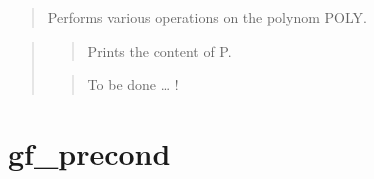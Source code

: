 \documentclass[a4paper,11pt,english]{sphinxmanual}
\begin{document}
\begin{sphinxVerbatim}[commandchars=\\\{\}]
  
  
\end{sphinxVerbatim}

\sphinxAtStartPar
{}
\begin{quote}

\sphinxAtStartPar
Performs various operations on the polynom POLY.
\end{quote}

\sphinxAtStartPar
{}
\begin{quote}

\sphinxAtStartPar
{}
\begin{quote}

\sphinxAtStartPar
Prints the content of P.
\end{quote}

\sphinxAtStartPar
{}
\begin{quote}

\sphinxAtStartPar
To be done … !
\end{quote}
\end{quote}


\section{gf\_precond}
\label{\detokenize{scilab/cmdref_gf_precond:gf-precond}}\label{\detokenize{scilab/cmdref_gf_precond::doc}}
\sphinxAtStartPar
{}
\end{document}
